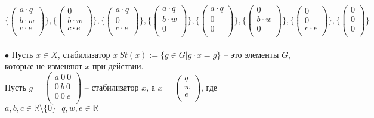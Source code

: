 \documentclass[12pt,a4paper]{scrartcl}
\begin{document}
	$$ \{ \begin{pmatrix}
	a\cdot q\\
	b \cdot w\\
	c \cdot e\\
	\end{pmatrix}\}, \{ \begin{pmatrix}
	0\\
	b \cdot w\\
	c \cdot e\\
	\end{pmatrix}\}, \{ \begin{pmatrix}
	a\cdot q\\
	0\\
	c \cdot e\\
	\end{pmatrix}\}, \{ \begin{pmatrix}
	a\cdot q\\
	b \cdot w\\
	0\\
	\end{pmatrix}\}, \{ \begin{pmatrix}
	a\cdot q\\
	0\\
	0\\
	\end{pmatrix}\}, \{ \begin{pmatrix}
	0\\
	b \cdot w\\
	0\\
	\end{pmatrix}\}, \{ \begin{pmatrix}
	0\\
	0\\
	c \cdot e\\
	\end{pmatrix}\}, \{ \begin{pmatrix}
	0\\
	0\\
	0\\
	\end{pmatrix}\}$$
	\\
	$\bullet$ Пусть $x \in X$, стабилизатор $x~St(x) := \{g \in G | g \cdot x = g\}$ -- это элементы $G$, которые не изменяют $x$ при действии.\\
	Пусть $g = \begin{pmatrix}
	a~0~0\\
	0~b~0\\
	0~0~c\\
	\end{pmatrix}$ -- стабилизатор $x$, а $x = \begin{pmatrix}
	q\\
	w\\
	e\\
	\end{pmatrix}$, где $a, b, c \in \mathbb{R} \setminus \{0\}~~~ q, w, e \in \mathbb{R}$\\
\end{document}
